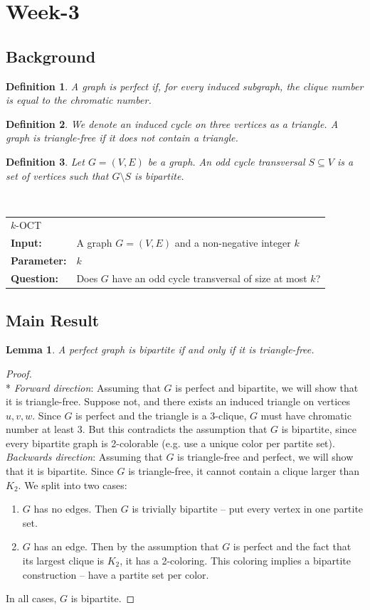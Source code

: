 \documentclass{article}
\newcommand{\problem}[1]{\textsc{#1}}
\newtheorem{lemma}{Lemma}
\newtheorem{definition}{Definition}
\newcommand{\defproblem}[4]{%
  \hfill\\\smallskip\noindent%
  \begin{tabularx}{\textwidth}{|l X|}%
    \hline%
    \multicolumn{2}{|l|}{\problem{#1}}\\%
    \textbf{Input:}&#2\\%
    \textbf{Parameter:}&#3\\%
    \textbf{Question:}&#4\smallskip\\\hline%
  \end{tabularx}%
  \smallskip%
}%
\newcommand{\proofnewline}{\mbox{}\\*}
\begin{document}
\newpage
\section*{Week-3}
\subsection*{Background}
\begin{definition}
A graph is \emph{perfect} if, for every induced subgraph, the clique number is equal to the chromatic number.
\end{definition}

\begin{definition}
We denote an induced cycle on three vertices as a \emph{triangle}. A graph is \emph{triangle-free} if it does not contain a triangle.
\end{definition}

\begin{definition}
Let $G = (V, E)$ be a graph. An \emph{odd cycle transversal} $S \subseteq V$ is a set of vertices such that $G \setminus S$ is bipartite.
\end{definition}

\defproblem{$k$-OCT}
{A graph $G = (V,E)$ and a non-negative integer $k$}
{$k$}
{Does $G$ have an odd cycle transversal of size at most $k$?}

\subsection*{Main Result}
\begin{lemma}
\label{lemma:perfect}
A perfect graph is bipartite if and only if it is triangle-free.
\end{lemma}
\begin{proof}\proofnewline
\emph{Forward direction}: Assuming that $G$ is perfect and bipartite, we will show that it is triangle-free. Suppose not, and there exists an induced triangle on vertices $u, v, w$. Since $G$ is perfect and the triangle is a 3-clique, $G$ must have chromatic number at least 3. But this contradicts the assumption that $G$ is bipartite, since every bipartite graph is 2-colorable (e.g. use a unique color per partite set).\\

\noindent \emph{Backwards direction}: Assuming that $G$ is triangle-free and perfect, we will show that it is bipartite. Since $G$ is triangle-free, it cannot contain a clique larger than $K_2$. We split into two cases:
\begin{enumerate}
\item $G$ has no edges. Then $G$ is trivially bipartite -- put every vertex in one partite set.
\item $G$ has an edge. Then by the assumption that $G$ is perfect and the fact that its largest clique is $K_2$, it has a 2-coloring. This coloring implies a bipartite construction -- have a partite set per color.
\end{enumerate}
In all cases, $G$ is bipartite.
\end{proof}
\end{document}
